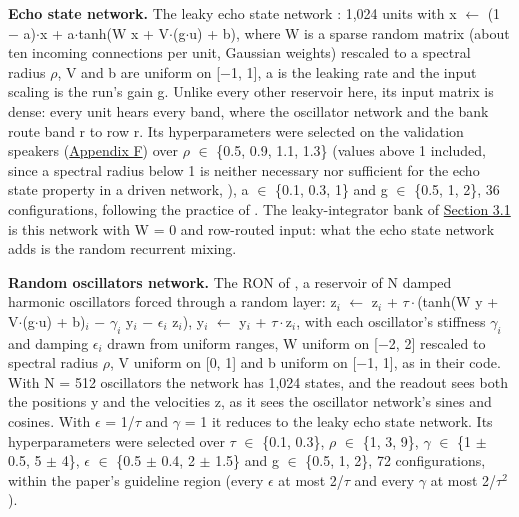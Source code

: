 \documentclass{article}
\begin{document}
\textbf{Echo state network.} The leaky echo state network
\citep{jaeger2001, jaeger2007}: 1,024 units with x
\ensuremath{\leftarrow} (1 \ensuremath{-} a)\ensuremath{\cdot}x +
a\ensuremath{\cdot}tanh(W x + V\ensuremath{\cdot}(g\ensuremath{\cdot}u)
+ b), where W is a sparse random matrix (about ten incoming connections
per unit, Gaussian weights) rescaled to a spectral radius
\ensuremath{\rho}, V and b are uniform on {[}\ensuremath{-}1, 1{]}, a is
the leaking rate and the input scaling is the run's gain g. Unlike every
other reservoir here, its input matrix is dense: every unit hears every
band, where the oscillator network and the bank route band r to row r.
Its hyperparameters were selected on the validation speakers
(\hyperref[sec-F]{Appendix F}) over \ensuremath{\rho} \ensuremath{\in}
\{0.5, 0.9, 1.1, 1.3\} (values above 1 included, since a spectral radius
below 1 is neither necessary nor sufficient for the echo state property
in a driven network, \citet{yildiz2012}), a \ensuremath{\in} \{0.1, 0.3,
1\} and g \ensuremath{\in} \{0.5, 1, 2\}, 36 configurations, following
the practice of \citet{lukosevicius2012}. The leaky-integrator bank of
\hyperref[sec-3-1]{Section 3.1} is this network with W = 0 and
row-routed input: what the echo state network adds is the random
recurrent mixing.

\textbf{Random oscillators network.} The RON of \citet{ceni2024}, a
reservoir of N damped harmonic oscillators forced through a random
layer: z\ensuremath{_{i}} \ensuremath{\leftarrow} z\ensuremath{_{i}} +
\ensuremath{\tau\cdot}(tanh(W y +
V\ensuremath{\cdot}(g\ensuremath{\cdot}u) + b)\ensuremath{_{i}}
\ensuremath{-} \ensuremath{\gamma_{i}} y\ensuremath{_{i}} \ensuremath{-}
\ensuremath{\epsilon_{i}} z\ensuremath{_{i}}), y\ensuremath{_{i}}
\ensuremath{\leftarrow} y\ensuremath{_{i}} +
\ensuremath{\tau\cdot}z\ensuremath{_{i}}, with each oscillator's
stiffness \ensuremath{\gamma_{i}} and damping \ensuremath{\epsilon_{i}}
drawn from uniform ranges, W uniform on {[}\ensuremath{-}2, 2{]}
rescaled to spectral radius \ensuremath{\rho}, V uniform on {[}0, 1{]}
and b uniform on {[}\ensuremath{-}1, 1{]}, as in their code. With N =
512 oscillators the network has 1,024 states, and the readout sees both
the positions y and the velocities z, as it sees the oscillator
network's sines and cosines. With \ensuremath{\epsilon} =
1/\ensuremath{\tau} and \ensuremath{\gamma} = 1 it reduces to the leaky
echo state network. Its hyperparameters were selected over
\ensuremath{\tau} \ensuremath{\in} \{0.1, 0.3\}, \ensuremath{\rho}
\ensuremath{\in} \{1, 3, 9\}, \ensuremath{\gamma} \ensuremath{\in} \{1
\ensuremath{\pm} 0.5, 5 \ensuremath{\pm} 4\}, \ensuremath{\epsilon}
\ensuremath{\in} \{0.5 \ensuremath{\pm} 0.4, 2 \ensuremath{\pm} 1.5\}
and g \ensuremath{\in} \{0.5, 1, 2\}, 72 configurations, within the
paper's guideline region (every \ensuremath{\epsilon} at most
2/\ensuremath{\tau} and every \ensuremath{\gamma} at most
2/\ensuremath{\tau^{2}}).
\end{document}
